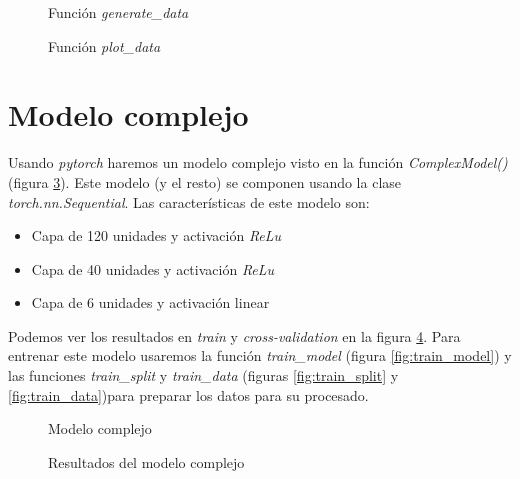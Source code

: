 \documentclass[6pt]{../../shared/AiTex}
\begin{document}
\begin{figure}[H]
    \centering
    
    \caption{Función \textit{generate\_data}}
    \label{fig:generate_data}
\end{figure}

\begin{figure}[H]
    \centering
    
    \caption{Función \textit{plot\_data}}
    \label{fig:plot_data}
\end{figure}

\section{Modelo complejo}

Usando \textit{pytorch} haremos un modelo complejo visto en la función \textit{ComplexModel()} (figura \ref{fig:complex_model}). Este modelo (y el resto) se componen usando la clase \textit{torch.nn.Sequential}. Las características de este modelo son:
\begin{itemize}
    \item Capa de 120 unidades y activación \textit{ReLu}
    \item Capa de 40 unidades y activación \textit{ReLu}
    \item Capa de 6 unidades y activación linear
\end{itemize}

Podemos ver los resultados en \textit{train} y \textit{cross-validation} en la figura \ref{fig:complex_results}. Para entrenar este modelo usaremos la función \textit{train\_model} (figura \ref{fig:train_model}) y las funciones \textit{train\_split} y \textit{train\_data}  (figuras \ref{fig:train_split} y \ref{fig:train_data})para preparar los datos para su procesado.

\begin{figure}[H]
    \centering
    
    \caption{Modelo complejo}
    \label{fig:complex_model}
\end{figure}

\begin{figure}[H]
    \centering
    
    \caption{Resultados del modelo complejo}
    \label{fig:complex_results}
\end{figure}
\end{document}
